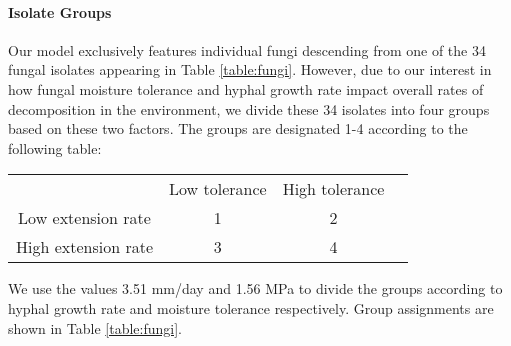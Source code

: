 \documentclass[12pt]{article}
\begin{document}
\paragraph{Isolate Groups}
Our model exclusively features individual fungi descending from one of the 34 fungal isolates appearing in Table \ref{table:fungi}. However, due to our interest in how fungal moisture tolerance and hyphal growth rate impact overall rates of decomposition in the environment, we divide these 34 isolates into four groups based on these two factors. The groups are designated 1-4 according to the following table:

\def\mca#1{\multicolumn{1}{c}{#1}}
\def\mcb#1{\multicolumn{1}{c|}{#1}}


\begin{center}
\begin{tabular}{c|c|c|c|}
  \mca{}  & \mca{Low tolerance} & \mca{High tolerance}\\\cline{2-3}
  \mcb{Low extension rate}   & 1    & 2\\\cline{2-3}
  \mcb{High extension rate}   & 3    & 4\\\cline{2-3}
\end{tabular}
\end{center}

\iffalse
\newenvironment{myindentpar}[1]%
  {\begin{list}{}%
          {\setlength{\leftmargin}{#1}}%
          \item[]%
  }
  {\end{list}}
  
\begin{myindentpar}{1cm}
\textbf{Group 1}: 
\emph{A. tabescens$_S$,
H. crustosa,
M. meridionalis,
P. robiniae$_S$,
P. robiniae$_N$,
P. hartigii}

\textbf{Group 2}:
\emph{A. sinapina,
A. gallica$_8$,
A. gallica$_2$,
A. gallica$_7$,
A. gallica$_5$,
A. gallica$_1$,
A. tabescens$_N$,
A. gallica$_3$,
A. gallica$_6$,
A. gallica$_4$,
S. commune$_S$,
X. subpileatus}

\textbf{Group 3}:
\emph{T. chioneus,
P. gilvus,
P. pendulus,
H. setigerum$_N$,
S. commune$_N$,
H. setigerum$_S$,
F. fomentarius,
P. sanguineus,
L. confericola,
L. crinitus,
P. flavidoalba$_N$}

\textbf{Group 4}:
\emph{Phlebia acerina$_S$,
P. acerina$_N$,
M. tremellosus,
M. tremullosus,
P. flavidoalba$_S$}

\end{myindentpar}
\fi
\noindent We use the values 3.51 mm/day and 1.56 MPa to divide the groups according to hyphal growth rate and moisture tolerance respectively. Group assignments are shown in Table \ref{table:fungi}.
\end{document}
